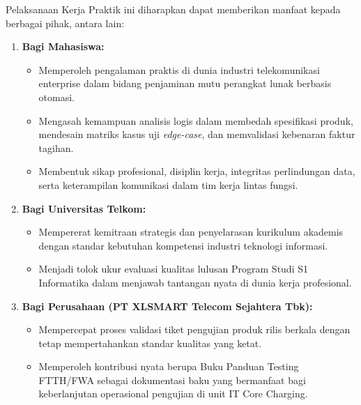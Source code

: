 \documentclass[12pt,a4paper]{article}
\begin{document}
\vspace{0.4cm}
Pelaksanaan Kerja Praktik ini diharapkan dapat memberikan manfaat kepada berbagai pihak, antara lain:
\begin{enumerate}[label=1.4.\arabic*,leftmargin=2.2em,itemsep=3pt,topsep=2pt]
    \item \textbf{Bagi Mahasiswa:}
    \begin{itemize}[label=--,leftmargin=1.2em,itemsep=1pt]
        \item Memperoleh pengalaman praktis di dunia industri telekomunikasi enterprise dalam bidang penjaminan mutu perangkat lunak berbasis otomasi.
        \item Mengasah kemampuan analisis logis dalam membedah spesifikasi produk, mendesain matriks kasus uji \textit{edge-case}, dan memvalidasi kebenaran faktur tagihan.
        \item Membentuk sikap profesional, disiplin kerja, integritas perlindungan data, serta keterampilan komunikasi dalam tim kerja lintas fungsi.
    \end{itemize}
    \item \textbf{Bagi Universitas Telkom:}
    \begin{itemize}[label=--,leftmargin=1.2em,itemsep=1pt]
        \item Mempererat kemitraan strategis dan penyelarasan kurikulum akademis dengan standar kebutuhan kompetensi industri teknologi informasi.
        \item Menjadi tolok ukur evaluasi kualitas lulusan Program Studi S1 Informatika dalam menjawab tantangan nyata di dunia kerja profesional.
    \end{itemize}
    \item \textbf{Bagi Perusahaan (PT XLSMART Telecom Sejahtera Tbk):}
    \begin{itemize}[label=--,leftmargin=1.2em,itemsep=1pt]
        \item Mempercepat proses validasi tiket pengujian produk rilis berkala dengan tetap mempertahankan standar kualitas yang ketat.
        \item Memperoleh kontribusi nyata berupa Buku Panduan Testing FTTH/FWA sebagai dokumentasi baku yang bermanfaat bagi keberlanjutan operasional pengujian di unit IT Core Charging.
    \end{itemize}
\end{enumerate}
\end{document}
